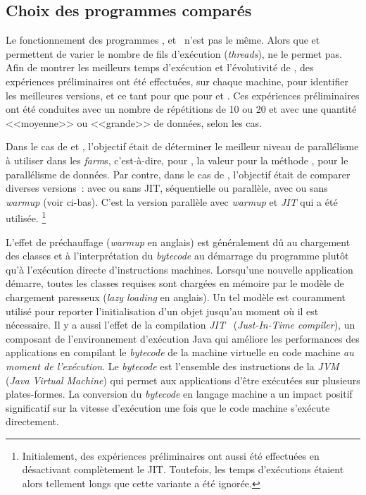 \subsection{Choix des programmes comparés}

Le fonctionnement des programmes ,  et~ n'est pas le m\^eme. Alors que  et  permettent de varier le nombre de fils d'ex\'ecution (\emph{threads}),  ne le permet pas. Afin de montrer les meilleurs temps d'ex\'ecution et l'\'evolutivit\'e de , des exp\'eriences pr\'eliminaires ont \'et\'e effectu\'ees, sur chaque machine, pour identifier les meilleures versions, et ce tant pour  que pour  et .
Ces exp\'eriences pr\'eliminaires ont \'et\'e conduites avec un nombre de r\'ep\'etitions de 10 ou 20 et avec une quantit\'e <<moyenne>> ou <<grande>> de donn\'ees, selon les cas. 

Dans le cas de  et , l'objectif \'etait de d\'eterminer le meilleur niveau de parall\'elisme \`a utiliser dans les \emph{farm}s, c'est-\`a-dire, pour , la valeur pour la m\'ethode , pour le parall\'elisme de donn\'ees.
%
Par contre, dans le cas de , l'objectif était de comparer diverses versions~: avec ou sans JIT, séquentielle ou parallèle, avec ou sans \emph{warmup} (voir ci-bas).
%
C'est la version parallèle avec \emph{warmup} et \emph{JIT} qui a \'et\'e utilis\'ee.%
%
\footnote{Initialement, des expériences préliminaires ont aussi été
effectuées en désactivant complètement le JIT. Toutefois, les temps
d'exécutions étaient alors tellement longs que cette variante a été
ignorée.}


L'effet de pr\'echauffage (\emph{warmup} en anglais) est g\'en\'eralement d\^u au chargement des classes et \`a l'interpr\'etation du \emph{bytecode} au d\'emarrage du programme plutôt qu'à l'exécution directe d'instructions machines. Lorsqu'une nouvelle application d\'emarre, toutes les classes requises sont charg\'ees en m\'emoire par le mod\`ele de chargement paresseux (\emph{lazy loading} en anglais). Un tel mod\`ele est couramment utilis\'e pour reporter l'initialisation d'un objet jusqu'au moment o\`u il est n\'ecessaire.
%
\label{jitDescription.sect}
%
Il y a aussi l'effet de la compilation 
\emph{JIT}~\citep{cramer1997compiling} (\emph{Just-In-Time compiler}),
%
un composant de l'environnement d'ex\'ecution Java qui am\'eliore les performances des applications en compilant le \emph{bytecode} de la machine virtuelle en code machine \emph{au moment de l'ex\'ecution}. Le \emph{bytecode} est l'ensemble des instructions de la \emph{JVM} (\emph{Java Virtual Machine}) qui permet aux applications d'\^etre ex\'ecut\'ees sur plusieurs plates-formes. La conversion du \emph{bytecode} en langage machine a un impact positif significatif sur la vitesse d'ex\'ecution une fois que le code machine s'exécute directement.

